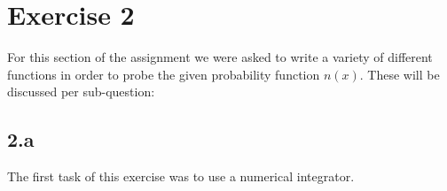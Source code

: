 \section{Exercise 2}

For this section of the assignment we were asked to write a variety of different functions in order to probe the given probability function $n(x)$. These will be discussed per sub-question:

\subsection{2.a}

The first task of this exercise was to use a numerical integrator.